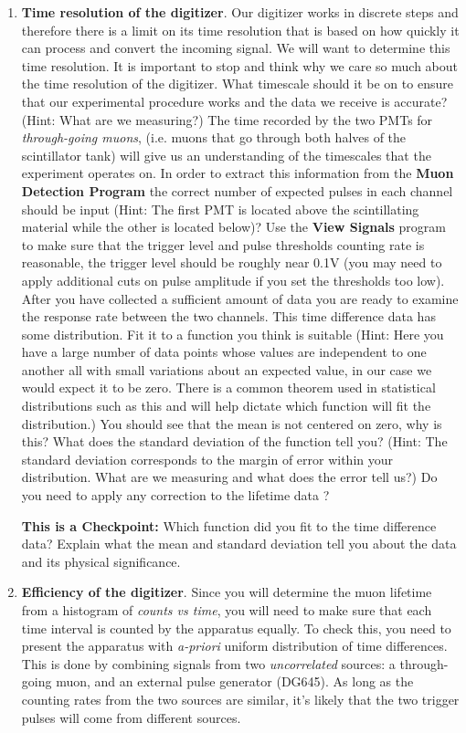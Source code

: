 \documentclass{../lab}
\begin{document}
\begin{enumerate}
    \item \textbf{Time resolution of the digitizer}. Our digitizer works in discrete steps and therefore there is a limit on its time resolution that is based on how quickly it can process and convert the incoming signal. We will want to determine this time resolution. It is important to stop and think why we care so much about the time resolution of the digitizer. What timescale should it be on to ensure that our experimental procedure works and the data we receive is accurate? (Hint: What are we measuring?) The time recorded by the two PMTs for \emph{through-going muons}, (i.e. muons that go through both halves of the scintillator tank) will give us an understanding of the timescales that the experiment operates on. In order to extract this information from the \textbf{Muon Detection Program} the correct number of expected pulses in each channel should be input (Hint: The first PMT is located above the scintillating material while the other is located below)? Use the \textbf{View Signals} program to make sure that the trigger level and pulse thresholds counting rate is reasonable, the trigger level should be roughly near 0.1V (you may need to apply additional cuts on pulse amplitude if you set the thresholds too low). After you have collected a sufficient amount of data you are ready to examine the response rate between the two channels. This time difference data has some distribution. Fit it to a function you think is suitable (Hint: Here you have a large number of data points whose values are independent to one another all with small variations about an expected value, in our case we would expect it to be zero. There is a common theorem used in statistical distributions such as this and will help dictate which function will fit the distribution.) You should see that the mean is not centered on zero, why is this? What does the standard deviation of the function tell you? (Hint: The standard deviation corresponds to the margin of error within your distribution. What are we measuring and what does the error tell us?) Do you need to apply any correction to the lifetime data ?
    
    \textbf{This is a Checkpoint: }Which function did you fit to the time difference data? Explain what the mean and standard deviation tell you about the data and its physical significance.\textbf{ }

    \item \textbf{Efficiency of the digitizer}. Since you will determine the muon lifetime from a histogram of \emph{counts vs time}, you will need to make sure that each time interval is counted by the apparatus equally. To check this, you need to present the apparatus with \emph{a-priori} uniform distribution of time differences. This is done by combining signals from two \emph{uncorrelated} sources: a through-going muon, and an external pulse generator (DG645). As long as the counting rates from the two sources are similar, it's likely that the two trigger pulses will come from different sources.


\end{enumerate}
\end{document}
